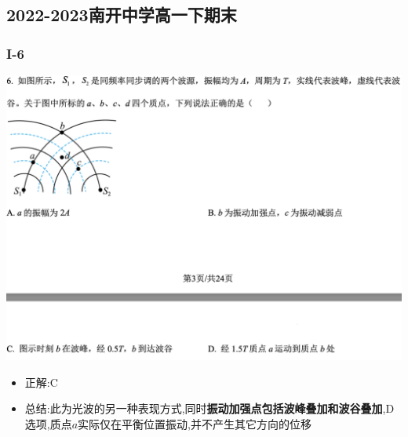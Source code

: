 \documentclass{article}
\begin{document}
        \subsection{2022-2023南开中学高一下期末}
        \subsubsection{I-6}
        \includegraphics[width=50em,keepaspectratio]{./pictures/1.3-8.png}
        \begin{itemize}
            \item 正解:\quad C
            \item 总结:\quad 此为光波的另一种表现方式,同时\textbf{振动加强点包括波峰叠加和波谷叠加},D选项,质点$a$实际仅在平衡位置振动,并不产生其它方向的位移
        \end{itemize}
\end{document}
